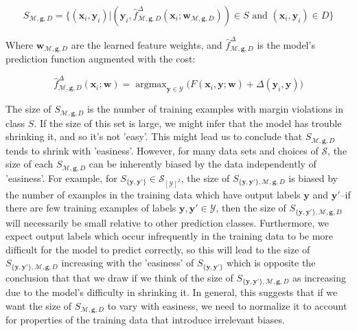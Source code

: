 \documentclass{article} %
\DeclareMathOperator*{\argmax}{argmax}
\begin{document}
\begin{equation}
S_{\mathcal{M},\mathbf{g},D}=\{(\textbf{x}_i,\textbf{y}_i) | (\mathbf{y}_i,\hat{f}^\Delta_{\mathcal{M},\mathbf{g},D}(\mathbf{x}_i;\mathbf{w}_{\mathcal{M},\mathbf{g},D}))\in S\text{ and }(\mathbf{x}_i,\mathbf{y}_i)\in D\}
\end{equation}

Where $\mathbf{w}_{\mathcal{M},\mathbf{g},D}$ are the learned feature weights,
and $\hat{f}^\Delta_{\mathcal{M},\mathbf{g},D}$ is the model's prediction
function augmented with the cost:

\begin{equation}
\hat{f}^\Delta_{\mathcal{M},\mathbf{g},D}(\mathbf{x}_i;\mathbf{w})=\argmax_{\mathbf{y}\in\mathcal{Y}}\Big( F(\mathbf{x}_i,\mathbf{y};\mathbf{w})
+\Delta(\mathbf{y}_i,\mathbf{y})\Big)
\end{equation}

The size of $S_{\mathcal{M},\mathbf{g},D}$ is the number of
training examples with margin violations in class $S$. If
the size of this set is large, we might infer that the
model has trouble shrinking it, and so it's not 'easy'.  This 
might lead us to conclude that $S_{\mathcal{M},\mathbf{g},D}$ 
tends to shrink with 'easiness'.  However,
for many data sets and choices of $\mathcal{S}$, the size 
of each $S_{\mathcal{M},\mathbf{g},D}$ can be inherently
biased by the data independently of 'easiness'.  For example, 
for $S_{\{\mathbf{y},\mathbf{y}'\}}\in\mathcal{S}_{[\mathcal{Y}]^2}$, 
the size of $S_{\{\mathbf{y},\mathbf{y}'\},\mathcal{M},\mathbf{g},D}$ 
is biased by the number of examples in the training data which have 
output labels $\mathbf{y}$ and $\mathbf{y}'$--if there are few 
training examples of labels 
$\mathbf{y},\mathbf{y}'\in\mathcal{Y}$, then the size of 
$S_{\{\mathbf{y}, \mathbf{y}'\},\mathcal{M},\mathbf{g},D}$ 
will necessarily be small relative to other prediction classes.
Furthermore, we expect 
output labels which occur infrequently in the training data to 
be more difficult for the model to predict correctly, so this
will lead to the size of 
$S_{\{\mathbf{y},\mathbf{y}'\},\mathcal{M},\mathbf{g},D}$ 
increasing with the 'easiness' of 
$S_{\{\mathbf{y},\mathbf{y}'\}}$ which is opposite the 
conclusion that that we draw if we think of the size of 
$S_{\{\mathbf{y},\mathbf{y}'\},\mathcal{M},\mathbf{g},D}$ as
increasing due to the model's difficulty in shrinking it.  In general, 
this suggests that if we want the size of $S_{\mathcal{M},\mathbf{g},D}$
to vary with easiness, we need to normalize it to account for 
properties of the training data that introduce irrelevant
biases.  
\end{document}
